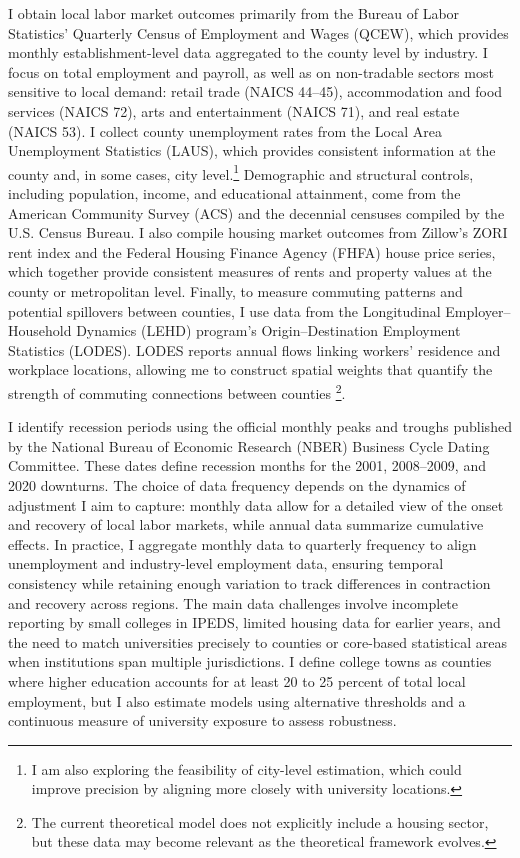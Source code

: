 I obtain local labor market outcomes primarily from the Bureau of Labor Statistics’ Quarterly Census of Employment and Wages (QCEW), which provides monthly establishment-level data aggregated to the county level by industry. I focus on total employment and payroll, as well as on non-tradable sectors most sensitive to local demand: retail trade (NAICS 44–45), accommodation and food services (NAICS 72), arts and entertainment (NAICS 71), and real estate (NAICS 53). I collect county unemployment rates from the Local Area Unemployment Statistics (LAUS), which provides consistent information at the county and, in some cases, city level.\footnote{I am also exploring the feasibility of city-level estimation, which could improve precision by aligning more closely with university locations.} Demographic and structural controls, including population, income, and educational attainment, come from the American Community Survey (ACS) and the decennial censuses compiled by the U.S. Census Bureau. I also compile housing market outcomes from Zillow’s ZORI rent index and the Federal Housing Finance Agency (FHFA) house price series, which together provide consistent measures of rents and property values at the county or metropolitan level. Finally, to measure commuting patterns and potential spillovers between counties, I use data from the Longitudinal Employer–Household Dynamics (LEHD) program’s Origin–Destination Employment Statistics (LODES). LODES reports annual flows linking workers’ residence and workplace locations, allowing me to construct spatial weights that quantify the strength of commuting connections between counties \footnote{The current theoretical model does not explicitly include a housing sector, but these data may become relevant as the theoretical framework evolves.}.

I identify recession periods using the official monthly peaks and troughs published by the National Bureau of Economic Research (NBER) Business Cycle Dating Committee. These dates define recession months for the 2001, 2008–2009, and 2020 downturns. The choice of data frequency depends on the dynamics of adjustment I aim to capture: monthly data allow for a detailed view of the onset and recovery of local labor markets, while annual data summarize cumulative effects. In practice, I aggregate monthly data to quarterly frequency to align unemployment and industry-level employment data, ensuring temporal consistency while retaining enough variation to track differences in contraction and recovery across regions. The main data challenges involve incomplete reporting by small colleges in IPEDS, limited housing data for earlier years, and the need to match universities precisely to counties or core-based statistical areas when institutions span multiple jurisdictions. I define college towns as counties where higher education accounts for at least 20 to 25 percent of total local employment, but I also estimate models using alternative thresholds and a continuous measure of university exposure to assess robustness.


